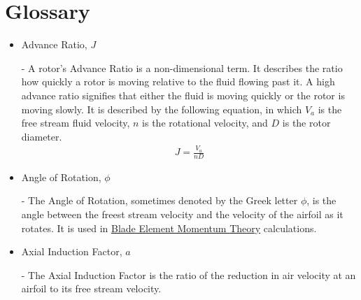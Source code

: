 \documentclass{article}
\begin{document}
\section{Glossary}
\begin{itemize}
	
	\item \hypertarget{J}{Advance Ratio, $J$} - A rotor's Advance Ratio is a non-dimensional term. It describes the ratio how quickly a rotor is moving relative to the fluid flowing past it. A high advance ratio signifies that either the fluid is moving quickly or the rotor is moving slowly. It is described by the following equation, in which $V_{a}$ is the free stream fluid velocity, $n$ is the rotational velocity, and $D$ is the rotor diameter.
	\begin{equation}
	\begin{aligned}
		J = \frac{V_{a}}{n D}
	\end{aligned}
	\end{equation}
	
	\item \hypertarget{phi}{Angle of Rotation, $\phi$} - The Angle of Rotation, sometimes denoted by the Greek letter $\phi$, is the angle between the freest stream velocity and the velocity of the airfoil as it rotates. It is used in \hyperlink{BEM}{Blade Element Momentum Theory} calculations.

	\item \hypertarget{a}{Axial Induction Factor, $a$} - The Axial Induction Factor is the ratio of the reduction in air velocity at an airfoil to its free stream velocity.
	

\end{itemize}
\end{document}
